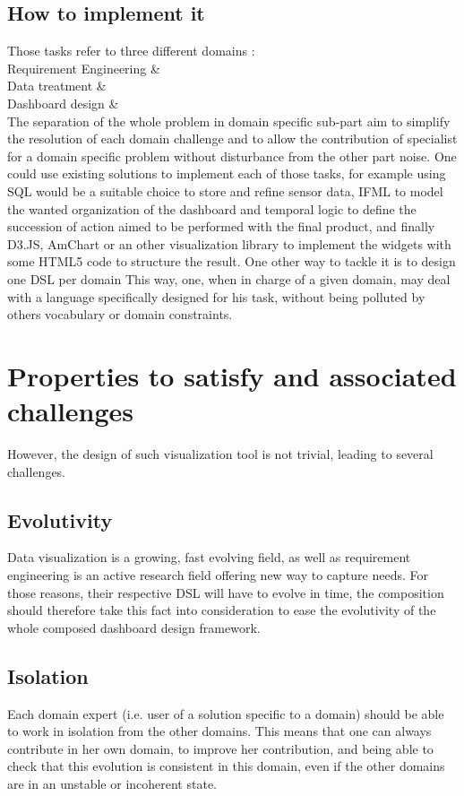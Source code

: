 \documentclass{acm_proc_article-sp}
\begin{document}
\subsection{How to implement it}
Those tasks refer to three different domains :\\
Requirement Engineering  \& \\
Data treatment  \& \\
Dashboard design  \& \\
The separation of the whole problem in domain specific sub-part aim to simplify
the resolution of each domain challenge and to allow the contribution of specialist
for a domain specific problem without disturbance from the other part noise.
One could use existing solutions to implement each of those tasks, for example
using SQL would be a suitable choice to store and refine sensor data, IFML to
model the wanted organization of the dashboard and temporal logic to define
the succession of action aimed to be performed with the final product, and finally
D3.JS, AmChart or an other visualization library to implement the widgets
with some HTML5 code to structure the result.
One other way to tackle it is to design one DSL per domain
This way, one, when in charge of a given domain, may deal with a language
specifically designed for his task, without being polluted by others
vocabulary or domain constraints.

\section{Properties to satisfy and associated challenges}
However, the design of such visualization tool is not trivial, leading to several challenges.

\subsection{Evolutivity}
Data visualization is a growing, fast evolving field, as well as requirement
engineering is an active research field offering new way to capture needs.
For those reasons, their respective DSL will have to evolve in time, the
composition should therefore take this fact into consideration to ease the
evolutivity of the whole composed dashboard design framework.

\subsection{Isolation}
Each domain expert (i.e. user of a solution specific to a domain) should be able to
work in isolation from the other domains. This means that one can always contribute
in her own domain, to improve her contribution, and being able to check that
this evolution is consistent in this domain, even if the other domains are in
an unstable or incoherent state.
\end{document}
